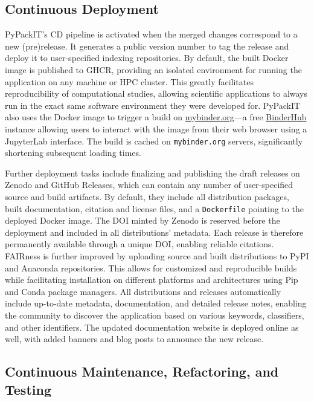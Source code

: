 \documentclass{article}
\begin{document}
\subsection{Continuous Deployment} \label{overview-cd}

PyPackIT's CD pipeline is activated when the merged changes correspond to a new (pre)release. It generates a public version number to tag the release and deploy it to user-specified indexing repositories. By default, the built Docker image is published to GHCR, providing an isolated environment for running the application on any machine or HPC cluster. This greatly facilitates reproducibility of computational studies, allowing scientific applications to always run in the exact same software environment they were developed for. PyPackIT also uses the Docker image to trigger a build on \href{https://mybinder.org}{mybinder.org}—a free \href{https://binderhub.readthedocs.io}{BinderHub} instance allowing users to interact with the image from their web browser using a JupyterLab interface. The build is cached on \texttt{mybinder.org} servers, significantly shortening subsequent loading times.

Further deployment tasks include finalizing and publishing the draft releases on Zenodo and GitHub Releases, which can contain any number of user-specified source and build artifacts. By default, they include all distribution packages, built documentation, citation and license files, and a \texttt{Dockerfile} pointing to the deployed Docker image. The DOI minted by Zenodo is reserved before the deployment and included in all distributions' metadata. Each release is therefore permanently available through a unique DOI, enabling reliable citations. FAIRness is further improved by uploading source and built distributions to PyPI and Anaconda repositories. This allows for customized and reproducible builds while facilitating installation on different platforms and architectures using Pip and Conda package managers. All distributions and releases automatically include up-to-date metadata, documentation, and detailed release notes, enabling the community to discover the application based on various keywords, classifiers, and other identifiers. The updated documentation website is deployed online as well, with added banners and blog posts to announce the new release.

\subsection{Continuous Maintenance, Refactoring, and Testing}
\end{document}
